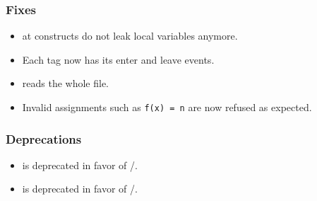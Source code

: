\subsubsection{Fixes}
\begin{itemize}
\item at constructs do not leak local variables anymore.
\item Each tag now has its enter and leave events.
\item {} reads the whole file.
\item Invalid assignments such as \lstinline|f(x) = n| are now refused as
  expected.
\end{itemize}

\subsubsection{Deprecations}
\begin{itemize}
\item {} is deprecated in favor of
  /.
\item {} is deprecated in favor of
  /.
\end{itemize}

